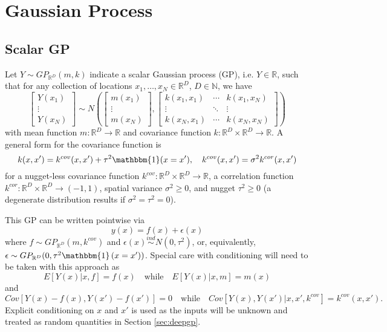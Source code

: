 \documentclass{article}
\newcommand{\ind}{\stackrel{ind}{\sim}}
\newcommand{\1}{\mathbbm{1}}
\begin{document}
\section{Gaussian Process}

\subsection{Scalar GP}

Let $Y\sim GP_{\mathbb{R}^{D}}(m,k)$ indicate a scalar Gaussian process (GP),
i.e. $Y\in \mathbb{R}$,
such that for any collection of locations $x_1,\ldots,x_N \in \mathbb{R}^{D}$,
$D \in \mathbb{N}$,
we have
\[
\left[ \begin{array}{c} Y(x_1) \\ \vdots \\ Y(x_N) \end{array}  \right] \sim
N\left(\left[\begin{array}{c}
m(x_1) \\ \vdots \\ m(x_N)
\end{array} \right],
\left[ \begin{array}{ccc}
k(x_1,x_1) & \cdots & k(x_1,x_N) \\
\vdots & \ddots & \vdots \\
k(x_N,x_1) & \cdots & k(x_N,x_N)
\end{array} \right] \right)
\]
with mean function $m: \mathbb{R}^{D} \to \mathbb{R}$ and
covariance function $k: \mathbb{R}^{D}\times \mathbb{R}^{D} \to \mathbb{R}$.
A general form for the covariance function is
\[
k(x,x') = k^{cov}(x,x') + \tau^2\1(x=x'), \quad
k^{cov}(x,x')  = \sigma^2 k^{cor}(x,x')
\]
for a nugget-less covariance function
$k^{cov}: \mathbb{R}^{D}\times \mathbb{R}^{D} \to \mathbb{R}$,
a correlation function
$k^{cor}: \mathbb{R}^{D}\times \mathbb{R}^{D} \to (-1,1)$,
spatial variance $\sigma^2\ge 0$, and nugget $\tau^2\ge 0$
(a degenerate distribution results if $\sigma^2=\tau^2=0$).

This GP can be written pointwise via
\[
y(x) = f(x) + \epsilon(x)
\]
where $f\sim GP_{\mathbb{R}^D}\left(m,k^{cov}\right)$ and
$\epsilon(x) \ind N(0,\tau^2)$, or, equivalently,
$\epsilon \sim GP_{\mathbb{R}^D}(0,\tau^2\1\left(x=x')\right)$.
Special care with conditioning will need to be taken with this approach as
\[
E[Y(x)|x,f] = f(x) \quad \mbox{while} \quad E[Y(x)|x,m] = m(x)
\]
and
\[
Cov[Y(x)-f(x),Y(x')-f(x')] = 0
\quad \mbox{while} \quad
Cov[Y(x),Y(x')|x,x',k^{cov}] = k^{cov}(x,x').
\]
Explicit conditioning on $x$ and $x'$ is used as the inputs will be unknown
and treated as random quantities in Section \ref{sec:deepgp}.
\end{document}
